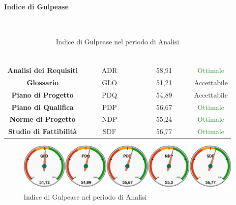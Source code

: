 \paragraph{Indice di Gulpease}\mbox{}\\[0,3cm]
\begin{table}[H]
	\centering
	\begin{tabular}{cccc}
	\rowcolor{greySWEight}
	\textcolor{white}{\textbf{Documento}} & 
	\textcolor{white}{\textbf{Abbreviazione}} &
	\textcolor{white}{\textbf{Valore Indice}}&
	\textcolor{white}{\textbf{Riscontro}}\\
	
	\textbf{Analisi dei Requisiti} & ADR & 58,91 & \textcolor{ForestGreen}{Ottimale} \\
	\textbf{Glossario} & GLO & 51,21 & \textcolor{YellowOrange}{Accettabile} \\
	\textbf{Piano di Progetto} & PDQ & 54,89 & \textcolor{YellowOrange}{Accettabile} \\
	\textbf{Piano di Qualifica} & PDP & 56,67 & \textcolor{ForestGreen}{Ottimale} \\
	\textbf{Norme di Progetto} & NDP & 55,24 & \textcolor{ForestGreen}{Ottimale} \\
	\textbf{Studio di Fattibilità} & SDF & 56,77 & \textcolor{ForestGreen}{Ottimale} \\

	\end{tabular}
	\caption{Indice di Gulpease nel periodo di Analisi}
\end{table}
\begin{figure}[H]
	\includegraphics[width=1\linewidth]{sez/App_Esito/graph/AN_Gulp.pdf}
	\caption{Indice di Gulpease nel periodo di Analisi}
\end{figure}

